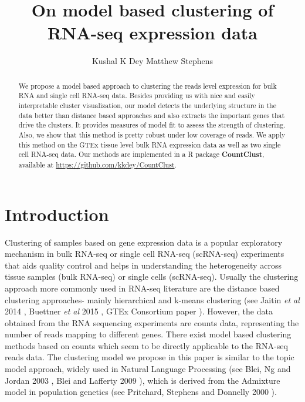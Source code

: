 \title{\Large{\textbf{On model based clustering of RNA-seq expression data}}}
\author{ Kushal K Dey  \qquad Matthew Stephens}

\maketitle

\begin{abstract}
We propose a model based approach to clustering the reads level expression for bulk RNA and single cell RNA-seq data. Besides providing us with nice and easily interpretable cluster visualization, our model detects the underlying structure in the data better than distance based approaches and also extracts the important genes that drive the clusters. It provides measures of model fit to assess the strength of clustering. Also, we show that this method is pretty robust under low coverage of reads. We apply this method on the GTEx tissue level bulk RNA expression data as well as two single cell RNA-seq data. Our methods are implemented in a R package \textbf{CountClust}, available at \url{https://github.com/kkdey/CountClust}.
\end{abstract}

\section{Introduction}

Clustering of samples based on gene expression data is a popular exploratory mechanism in bulk RNA-seq or single cell RNA-seq (scRNA-seq) experiments that aids quality control and helps in understanding the heterogeneity across tissue samples (bulk RNA-seq) or single cells (scRNA-seq). Usually the clustering approach more commonly used in RNA-seq literature are the distance based clustering approaches- mainly hierarchical and k-means clustering (see Jaitin \textit{et al} 2014 \cite{Jaitin2014}, Buettner \textit{et al} 2015 \cite{Buettner2015}, GTEx Consortium paper \cite{GTEX2013}). However, the data obtained from the RNA sequencing experiments are counts data, representing the number of reads mapping to different genes. There exist model based clustering methods based on counts which seem to be directly applicable to the RNA-seq reads data. The clustering model we propose in this paper is similar to the topic model approach, widely used in Natural Language Processing (see Blei, Ng and Jordan 2003 \cite{Blei2003}, Blei and Lafferty 2009 \cite{Blei2009}), which is derived from the Admixture model in population genetics (see Pritchard, Stephens and Donnelly 2000 \cite{Pritchard2000}). \\[2 pt]

